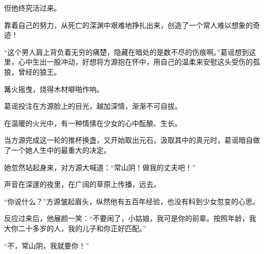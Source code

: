 \begin{this_body}
但他终究活过来。

靠着自己的努力，从死亡的深渊中艰难地挣扎出来，创造了一个常人难以想象的奇迹！

“这个男人肩上背负着无穷的痛楚，隐藏在暗处的是数不尽的伤痕啊。”葛谣想到这里，心中生出一股冲动，好想将方源抱在怀中，用自己的温柔来安慰这头受伤的孤狼，曾经的狼王。

篝火摇曳，烧得木材噼啪作响。

葛谣投注在方源脸上的目光，越加深情，渐渐不可自拔。

在温暖的火光中，有一种情愫在少女的心中酝酿、生长。

当方源完成这一轮的推杯换盏，又开始取出元石，汲取其中的真元时，葛谣暗自做了一个她人生中的最重大的决定。

她忽然站起身来，对方源大喊道：“常山阴！做我的丈夫吧！”

声音在深邃的夜里，在广阔的草原上传播，远去。

“你说什么？”方源皱起眉头，纵然他有五百年经验，也没有料到少女忽变的心思。

反应过来后，他展颜一笑：“不要闹了，小姑娘，我可是你的前辈。按照年龄，我大你二十多岁的人，我的儿子和你正好匹配。”

“不，常山阴，我就要你！”

\end{this_body}

